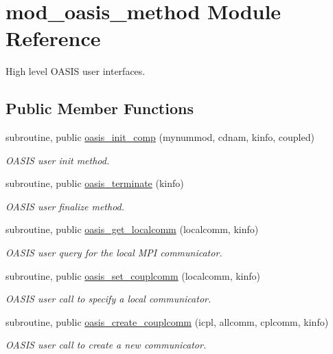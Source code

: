 \hypertarget{classmod__oasis__method}{\section{mod\+\_\+oasis\+\_\+method Module Reference}
\label{classmod__oasis__method}
}


High level O\+A\+S\+I\+S user interfaces.  


\subsection*{Public Member Functions}
\begin{DoxyCompactItemize}
\item 
subroutine, public \hyperlink{classmod__oasis__method_a9d642dd3ca229a1b957bc3c92b33c356}{oasis\+\_\+init\+\_\+comp} (mynummod, cdnam, kinfo, coupled)
\begin{DoxyCompactList}\small\item\em O\+A\+S\+I\+S user init method. \end{DoxyCompactList}\item 
subroutine, public \hyperlink{classmod__oasis__method_a4fb881336906c9452b6a9f250af9c3d7}{oasis\+\_\+terminate} (kinfo)
\begin{DoxyCompactList}\small\item\em O\+A\+S\+I\+S user finalize method. \end{DoxyCompactList}\item 
subroutine, public \hyperlink{classmod__oasis__method_ae5f78b3c9b89a40c3a9e20063ccd69fd}{oasis\+\_\+get\+\_\+localcomm} (localcomm, kinfo)
\begin{DoxyCompactList}\small\item\em O\+A\+S\+I\+S user query for the local M\+P\+I communicator. \end{DoxyCompactList}\item 
subroutine, public \hyperlink{classmod__oasis__method_a3edf1cd01a0765eba643d0cecd71814e}{oasis\+\_\+set\+\_\+couplcomm} (localcomm, kinfo)
\begin{DoxyCompactList}\small\item\em O\+A\+S\+I\+S user call to specify a local communicator. \end{DoxyCompactList}\item 
subroutine, public \hyperlink{classmod__oasis__method_a50dc6d05005689e3b4e3831e92a63e30}{oasis\+\_\+create\+\_\+couplcomm} (icpl, allcomm, cplcomm, kinfo)
\begin{DoxyCompactList}\small\item\em O\+A\+S\+I\+S user call to create a new communicator. \end{DoxyCompactList}\item 

\end{DoxyCompactItemize}
